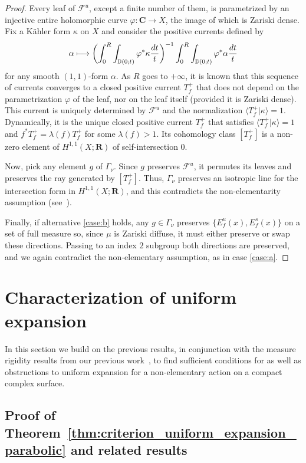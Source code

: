 \documentclass[11pt]{article}
\newcommand{\Subsection}{\subsection}
\newcommand\mto{\mathchoice{\longmapsto}{\mapsto}{\mapsto}{\mapsto}}
\newcommand{\bblrpar}[1]{\biggl(#1\biggr)}
\newcommand{\disk}{\mathbb{D}}
\def\C{\mathbf{C}}
\def\R{\mathbf{R}}
\theoremstyle{plain}
\theoremstyle{definition}
\numberwithin{equation}{section}
\begin{document}
\begin{proof}
Every leaf of $\mathcal F^u$, except a finite number of them, is parametrized by an injective entire holomorphic curve $\varphi\colon \C\to X$, the image of which is Zariski dense.
Fix a Kähler form $\kappa$ on $X$ and consider the positive currents defined by
\begin{equation*}
\alpha\mto \bblrpar{\int_0^R\int_{\disk(0;t)} \varphi^*\kappa \frac{dt}{t}}^{-1} \int_0^R\int_{\disk(0;t)} \varphi^*\alpha \frac{dt}{t}
\end{equation*}
for any smooth $(1,1)$-form $\alpha$. As $R$ goes to $+\infty$, it is known that this sequence of currents converges to a closed positive current $T^+_f$
that does not depend on the parametrization $\varphi$ of the leaf, nor on the leaf itself (provided it is Zariski dense).
This current is uniquely determined by $\mathcal F^u$ and the normalization $\langle T^+_f\vert \kappa \rangle= 1$. Dynamically, it is
the unique closed positive current $T^+_f$ that satisfies $\langle T^+_f\vert \kappa \rangle= 1$ and $f^*T^+_f=\lambda(f)T^+_f$ for some $\lambda(f)>1$.
Its cohomology class $[T^+_f]$ is a non-zero element of $H^{1,1}(X;\R)$ of self-intersection $0$.

Now, pick any element $g$ of $\Gamma_\nu$. Since $g$ preserves $\mathcal F^u$, it permutes its leaves and preserves the ray generated by $[T^+_f]$.
Thus, $\Gamma_\nu$ preserves an isotropic line for the intersection form in $H^{1,1}(X;\R)$, and this contradicts the non-elementarity assumption (see~\cite[\S 2.3]{stiffness}).

Finally, if alternative \eqref{case:b} holds, any $g\in \Gamma_\nu$ preserves
$ \{E^u_f(x), E^s_f(x)\}$ on a set of full measure so,
since $\mu$ is Zariski diffuse,
it must either preserve or
swap these directions. Passing to an index $2$ subgroup both directions are preserved, and we again contradict the non-elementary assumption, as in case \eqref{case:a}.
\end{proof}

\section{Characterization of uniform expansion}\label{sec:characterization}
In this section we build on the previous results, in conjunction with the measure rigidity
results from our previous work~\cite{stiffness},
to find sufficient conditions for as well as obstructions to
uniform expansion for a non-elementary action on a compact complex surface.

\Subsection{Proof of Theorem~\ref{thm:criterion_uniform_expansion_parabolic} and related results}
\end{document}
